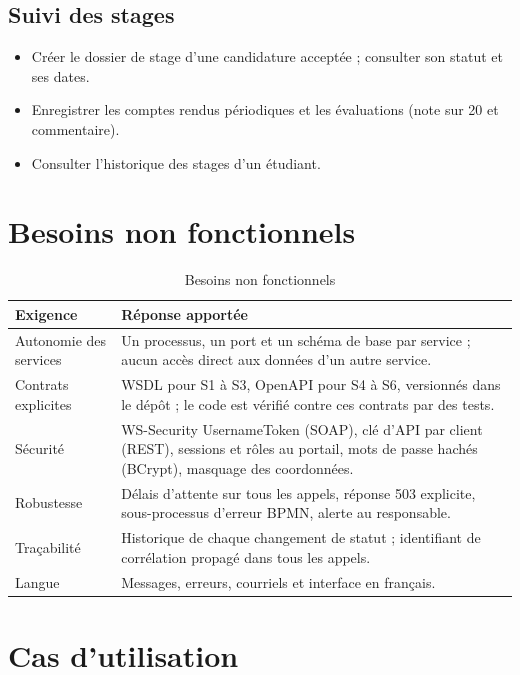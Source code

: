 \subsection{Suivi des stages}
\begin{itemize}
  \item Créer le dossier de stage d'une candidature acceptée ; consulter son statut et ses dates.
  \item Enregistrer les comptes rendus périodiques et les évaluations (note sur 20 et commentaire).
  \item Consulter l'historique des stages d'un étudiant.
\end{itemize}

\section{Besoins non fonctionnels}

\begin{table}[H]
\centering\small
\begin{tabularx}{\linewidth}{@{}l>{\raggedright\arraybackslash}X@{}}
\toprule
\textbf{Exigence} & \textbf{Réponse apportée} \\ \midrule
Autonomie des services & Un processus, un port et un schéma de base par service ; aucun accès direct aux données d'un autre service. \\
Contrats explicites & WSDL pour S1 à S3, OpenAPI pour S4 à S6, versionnés dans le dépôt ; le code est vérifié contre ces contrats par des tests. \\
Sécurité & WS-Security UsernameToken (SOAP), clé d'API par client (REST), sessions et rôles au portail, mots de passe hachés (BCrypt), masquage des coordonnées. \\
Robustesse & Délais d'attente sur tous les appels, réponse 503 explicite, sous-processus d'erreur BPMN, alerte au responsable. \\
Traçabilité & Historique de chaque changement de statut ; identifiant de corrélation propagé dans tous les appels. \\
Langue & Messages, erreurs, courriels et interface en français. \\
\bottomrule
\end{tabularx}
\caption{Besoins non fonctionnels}\label{tab:non-fonctionnels}
\end{table}

\section{Cas d'utilisation}

